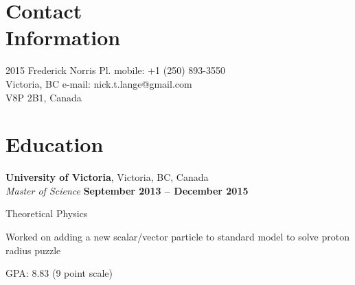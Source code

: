 \documentclass[margin,line]{resume}
\begin{document}
\begin{resume}

    \section{\mysidestyle Contact\\Information}

    2015 Frederick Norris Pl.   \hfill mobile: +1 (250) 893-3550          \vspace{0mm}\\\vspace{0mm}%
    Victoria, BC                \hfill e-mail: nick.t.lange@gmail.com     \vspace{0mm}\\\vspace{0mm}%
    V8P 2B1, Canada             \hfill   \vspace{0mm}\\\vspace{-4.5mm}%



    \section{\mysidestyle Education}

    \textbf{University of Victoria}, Victoria, BC, Canada \vspace{2mm}\\\vspace{1mm}%
    \textsl{Master of Science} \hfill \textbf{ September 2013 -- December 2015}\vspace{-3mm}\\\vspace{-1mm}%
    \begin{list2}
        \item Theoretical Physics
        \item Worked on adding a new scalar/vector particle to standard model to solve proton radius puzzle
        \item GPA: 8.83 (9 point scale)
    \end{list2}\vspace{2mm}


\end{resume}
\end{document}
